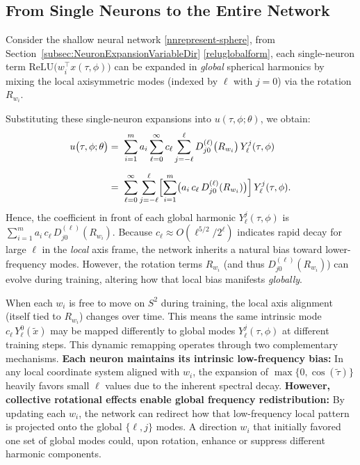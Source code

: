 \documentclass[review,onefignum,onetabnum,onealgnum]{siamart250106}
\numberwithin{theorem}{section}
\begin{document}
\subsection{From Single Neurons to the Entire Network}

Consider the shallow neural network \eqref{nnrepresent-sphere},  from Section~\ref{subsec:NeuronExpansionVariableDir} \eqref{reluglobalform}, each single-neuron term 
\(\mathrm{ReLU}\!\bigl(w_i^\top x(\tau,\phi)\bigr)\) can be expanded in \emph{global} spherical harmonics by mixing the 
local axisymmetric modes (indexed by \(\ell\) with \(j=0\)) via the rotation \(R_{w_i}\).  


Substituting these single-neuron expansions into $u(\tau,\phi;\theta)$, we obtain:
\[
\begin{aligned}
u\bigl(\tau,\phi;\theta\bigr)
&=\;
\sum_{i=1}^{m} 
a_i 
\sum_{\ell=0}^{\infty}
c_{\ell}
\sum_{j=-\ell}^{\ell} 
D_{j0}^{(\ell)}\bigl(R_{w_i}\bigr)\,
Y_{\ell}^j(\tau,\phi)
\\[5pt]
&=\;
\sum_{\ell=0}^{\infty}
\sum_{j=-\ell}^{\ell}
\Bigl[
\sum_{i=1}^{m} 
\bigl(a_i\,c_{\ell}\,D_{j0}^{(\ell)}(R_{w_i})\bigr)
\Bigr]
\,Y_{\ell}^j(\tau,\phi).
\end{aligned}
\]
Hence, the coefficient in front of each global harmonic $Y_{\ell}^j(\tau,\phi)$ is 
\(\sum\limits_{i=1}^m a_i\,c_{\ell}\,D_{j0}^{(\ell)}(R_{w_i})\).  Because \(c_{\ell}\approx O(\ell^{5/2}/2^\ell)\) 
indicates rapid decay for large \(\ell\) in the \emph{local} axis frame, the network inherits a natural bias toward 
lower-frequency modes.  However, the rotation terms $R_{w_i}$ (and thus $D_{j0}^{(\ell)}(R_{w_i})$) can evolve 
during training, altering how that local bias manifests \emph{globally}.


When each $w_i$ is free to move on $S^2$ during training, the local axis alignment (itself tied to $R_{w_i}$) changes over time. This means the same intrinsic mode $c_{\ell}\,Y_{\ell}^0(\tilde{x})$ may be mapped differently to global modes $Y_{\ell}^j(\tau,\phi)$ at different training steps. This dynamic remapping operates through two complementary mechanisms. \textbf{Each neuron maintains its intrinsic low-frequency bias:} In any local coordinate system aligned with $w_i$, the expansion of $\max\{0,\cos(\tilde{\tau})\}$ heavily favors small $\ell$ values due to the inherent spectral decay. \textbf{However, collective rotational effects enable global frequency redistribution:} By updating each $w_i$, the network can redirect how that low-frequency local pattern is projected onto the global $\{\ell,j\}$ modes. A direction $w_i$ that initially favored one set of global modes could, upon rotation, enhance or suppress different harmonic components.
\end{document}

